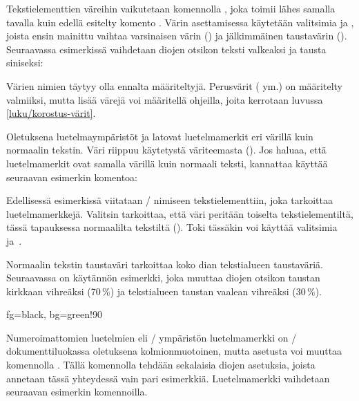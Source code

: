 Tekstielementtien väreihin vaikutetaan komennolla
, joka toimii lähes samalla tavalla kuin edellä
esitelty komento . Värin asettamisessa käytetään
valitsimia  ja , joista ensin mainittu vaihtaa
varsinaisen värin () ja jälkimmäinen taustavärin
(). Seuraavassa esimerkissä vaihdetaan diojen
otsikon teksti valkeaksi ja tausta siniseksi:

\begin{koodilohkosis}
\end{koodilohkosis}

\noindent
Värien nimien täytyy olla ennalta määriteltyjä. Perusvärit
( ym.) on määritelty
valmiiksi, mutta lisää värejä voi määritellä ohjeilla, joita kerrotaan
luvussa \ref{luku/korostus-värit}.

Oletuksena luetelmaympäristöt  ja
 latovat luetelmamerkit eri värillä kuin normaalin
tekstin. Väri riippuu käytetystä väriteemasta ().
Jos haluaa, että luetelmamerkit ovat samalla värillä kuin normaali
teksti, kannattaa käyttää seuraavan esimerkin komentoa:

\begin{koodilohkosis}
\end{koodilohkosis}

\noindent
Edellisessä esimerkissä viitataan \-/ nimiseen
tekstielementtiin, joka tarkoittaa luetelmamerkkejä. Valitsin
 tarkoittaa, että väri peritään toiselta
tekstielementiltä, tässä tapauksessa normaalilta tekstiltä
(). Toki tässäkin voi käyttää valitsimia
 ja~.

Normaalin tekstin taustaväri tarkoittaa koko dian tekstialueen
taustaväriä. Seuraavassa on käytännön esimerkki, joka muuttaa diojen
otsikon taustan kirkkaan vihreäksi (70\,\%) ja tekstialueen taustan
vaalean vihreäksi (30\,\%).

\begin{koodilohkosis}
 {fg=black, bg=green!90}
\end{koodilohkosis}

\noindent
Numeroimattomien luetelmien eli \-/ ympäristön
luetelmamerkki on \-/ dokumenttiluokassa oletuksena
kolmionmuotoinen, mutta asetusta voi muuttaa komennolla
. Tällä komennolla tehdään sekalaisia diojen
asetuksia, joista annetaan tässä yhteydessä vain pari esimerkkiä.
Luetelmamerkki vaihdetaan seuraavan esimerkin komennoilla.

